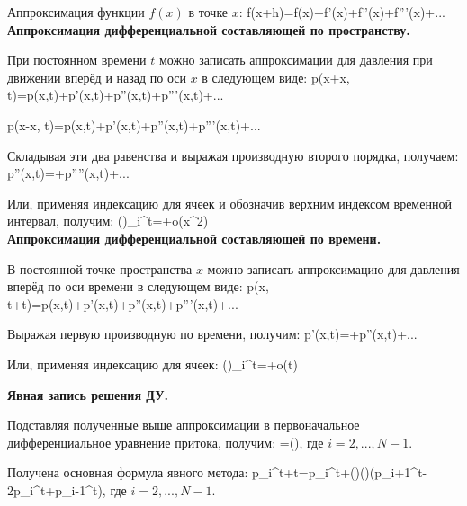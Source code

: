 Аппроксимация функции $f(x)$ в точке $x$:
\beq
f(x+h)=f(x)+f'(x)+f''(x)+f'''(x)+...
\eeq
\ \\

\textbf{Аппроксимация дифференциальной составляющей по пространству.}

При постоянном времени $t$ можно записать аппроксимации для давления при движении вперёд и назад по оси $x$ в следующем виде:
\beq
p(x+\Delta x, t)=p(x,t)+p'(x,t)+p''(x,t)+p'''(x,t)+...
\eeq

\beq
p(x-\Delta x, t)=p(x,t)+p'(x,t)+p''(x,t)+p'''(x,t)+...
\eeq

Складывая эти два равенства и выражая производную второго порядка, получаем:
\beq
p''(x,t)=+p''''(x,t)+...
\eeq

Или, применяя индексацию для ячеек и обозначив верхним индексом временной интервал, получим:
\beq
\left(\right)_{\!\!i}^{\!\!t}=+o(\Delta x^2)
\eeq
\ \\

\textbf{Аппроксимация дифференциальной составляющей по времени.}

В постоянной точке пространства $x$ можно записать аппроксимацию для давления вперёд по оси времени в следующем виде:
\beq
p(x, t+\Delta t)=p(x,t)+p'(x,t)+p''(x,t)+p'''(x,t)+...
\eeq

Выражая первую производную по времени, получим:
\beq
p'(x,t)=+p''(x,t)+...
\eeq

Или, применяя индексацию для ячеек:
\beq
\left(\right)_{\!\!i}^{\!\!t}=+o(\Delta t)
\eeq

\textbf{Явная запись решения ДУ.}

Подставляя полученные выше аппроксимации в первоначальное дифференциальное уравнение притока, получим:
\beq
{}=\left(\right),
\eeq
где $i=2,...,N-1$.

Получена основная формула явного метода:
\beq
p_i^{t+\Delta t}=p_i^t+\left(\right)\left(\right)\left(p_{i+1}^t-2p_i^t+p_{i-1}^t\right),
\eeq
где $i=2,...,N-1$.

